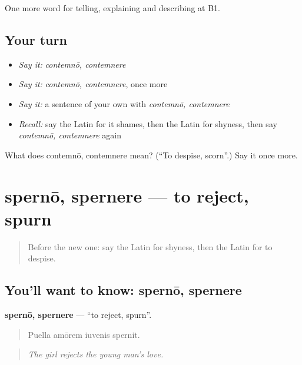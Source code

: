 \begin{grammarlens}[title={What you've built}]
One more word for telling, explaining and describing at B1.
\end{grammarlens}

\subsection*{Your turn}
\begin{itemize}
\raggedright
  \item \emph{Say it:} \emph{contemnō, contemnere}
  \item \emph{Say it:} \emph{contemnō, contemnere}, once more
  \item \emph{Say it:} a sentence of your own with \emph{contemnō, contemnere}
  \item \emph{Recall:} say the Latin for it shames, then the Latin for shyness, then say \emph{contemnō, contemnere} again
\end{itemize}

\begin{tcolorbox}[breakable,colback=teal!4,colframe=teal!35!black,title={Before you move on}]
What does contemnō, contemnere mean? (\textquotedblleft{}To despise, scorn\textquotedblright{}.) Say it once more.
\end{tcolorbox}
\section[spernō, spernere]{spernō, spernere — to reject, spurn}

\label{lesson:LA-C514-sperno}



\begin{quote}
Before the new one: say the Latin for shyness, then the Latin for to despise.
\end{quote}

\subsection*{You'll want to know: spernō, spernere}
\textbf{spernō, spernere} — \textquotedblleft{}to reject, spurn\textquotedblright{}.

\begin{quote}
Puella amōrem iuvenis spernit.
\end{quote}

\begin{quote}
\emph{The girl rejects the young man's love.}
\end{quote}

